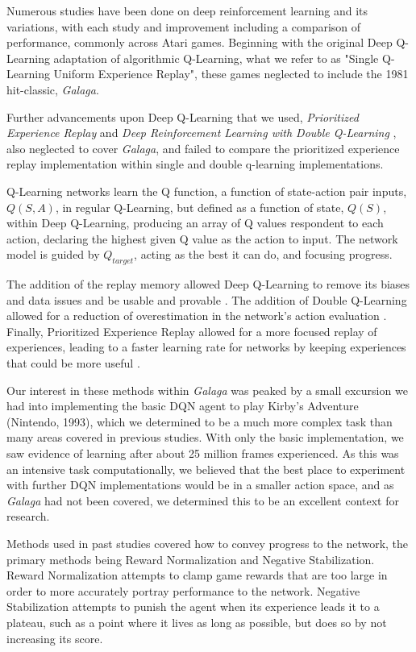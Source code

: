\documentclass[conference]{IEEEtran}
\begin{document}
Numerous studies have been done on deep reinforcement learning and its variations, with each study and improvement including a comparison of performance, commonly across Atari games. Beginning with the original Deep Q-Learning \cite{Mnih2015} adaptation of algorithmic Q-Learning\cite{Watkins1989}, what we refer to as "Single Q-Learning Uniform Experience Replay", these games neglected to include the 1981 hit-classic, \textit{Galaga}. \par
Further advancements upon Deep Q-Learning that we used, \textit{Prioritized Experience Replay}\cite{schaul2015prioritized} and \textit{Deep Reinforcement Learning with Double Q-Learning} \cite{hasselt2015deep}, also neglected to cover \textit{Galaga}, and failed to compare the prioritized experience replay implementation within single and double q-learning implementations. \par
Q-Learning networks learn the Q function, a function of state-action pair inputs, $Q(S,A)$, in regular Q-Learning, but defined as a function of state, $Q(S)$, within Deep Q-Learning, producing an array of Q values respondent to each action, declaring the highest given Q value as the action to input. The network model is guided by $Q_{target}$, acting as the best it can do, and focusing progress. \par
The addition of the replay memory allowed Deep Q-Learning to remove its biases and data issues and be usable and provable \cite{Mnih2015}. The addition of Double Q-Learning allowed for a reduction of overestimation in the network's action evaluation \cite{hasselt2015deep}. Finally, Prioritized Experience Replay allowed for a more focused replay of experiences, leading to a faster learning rate for networks by keeping experiences that could be more useful \cite{schaul2015prioritized}. \par
Our interest in these methods within \textit{Galaga} was peaked by a small excursion we had into implementing the basic DQN agent to play Kirby's Adventure (Nintendo, 1993), which we determined to be a much more complex task than many areas covered in previous studies. With only the basic implementation, we saw evidence of learning after about 25 million frames experienced. As this was an intensive task computationally, we believed that the best place to experiment with further DQN implementations would be in a smaller action space, and as \textit{Galaga} had not been covered, we determined this to be an excellent context for research. \par
Methods used in past studies covered how to convey progress to the network, the primary methods being Reward Normalization and Negative Stabilization. Reward Normalization attempts to clamp game rewards that are too large in order to more accurately portray performance to the network. Negative Stabilization attempts to punish the agent when its experience leads it to a plateau, such as a point where it lives as long as possible, but does so by not increasing its score. \par
\end{document}
